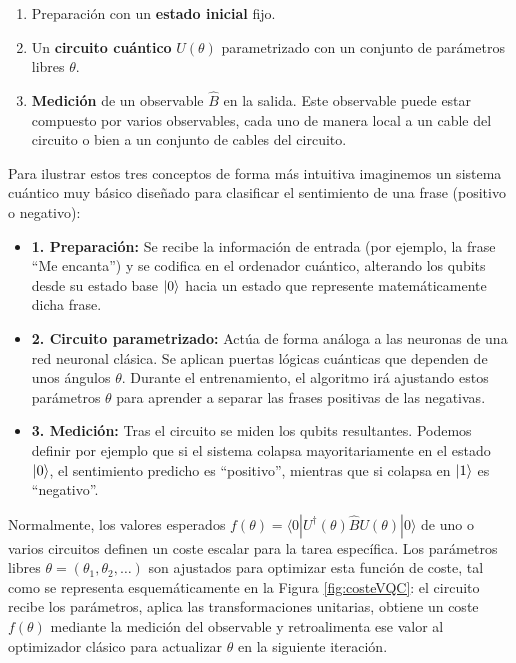 \begin{enumerate}
    \item Preparación con un \textbf{estado inicial} fijo.
    \item Un \textbf{circuito cuántico} $U(\theta)$ parametrizado con un conjunto de parámetros libres $\theta$.
    \item \textbf{Medición} de un observable $\hat{B}$ en la salida. Este observable puede estar compuesto por varios observables, cada uno de manera local a un cable del circuito o bien a un conjunto de cables del circuito.
\end{enumerate}

Para ilustrar estos tres conceptos de forma más intuitiva imaginemos un sistema cuántico muy básico diseñado para clasificar el sentimiento de una frase (positivo o negativo):
\begin{itemize}
    \item \textbf{1. Preparación:} Se recibe la información de entrada (por ejemplo, la frase ``Me encanta'') y se codifica en el ordenador cuántico, alterando los qubits desde su estado base $\ket{0}$ hacia un estado que represente matemáticamente dicha frase.
    \item \textbf{2. Circuito parametrizado:} Actúa de forma análoga a las neuronas de una red neuronal clásica. Se aplican puertas lógicas cuánticas que dependen de unos ángulos $\theta$. Durante el entrenamiento, el algoritmo irá ajustando estos parámetros $\theta$ para aprender a separar las frases positivas de las negativas.
    \item \textbf{3. Medición:} Tras el circuito se miden los qubits resultantes. Podemos definir por ejemplo que si el sistema colapsa mayoritariamente en el estado $\ket{0}$, el sentimiento predicho es ``positivo'', mientras que si colapsa en $\ket{1}$ es ``negativo''.
\end{itemize}

Normalmente, los valores esperados $f(\theta) = \langle 0 | U^\dagger(\theta) \hat{B} U(\theta) | 0 \rangle$ de uno o varios circuitos definen un coste escalar para la tarea específica. Los parámetros libres $\theta = (\theta_1, \theta_2, \dots)$ son ajustados para optimizar esta función de coste, tal como se representa esquemáticamente en la Figura \ref{fig:costeVQC}: el circuito recibe los parámetros, aplica las transformaciones unitarias, obtiene un coste $f(\theta)$ mediante la medición del observable y retroalimenta ese valor al optimizador clásico para actualizar $\theta$ en la siguiente iteración.

